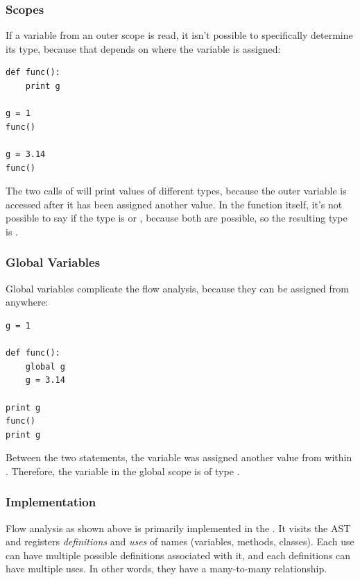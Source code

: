 \documentclass[12pt,halfparskip]{scrreprt}
\begin{document}
\subsubsection{Scopes}

If a variable from an outer scope is read, it isn't possible to specifically determine its type, because that depends on where the variable is assigned:

\begin{lstlisting}
def func():
    print g

g = 1
func()

g = 3.14
func()
\end{lstlisting}

The two calls of  will print values of different types, because the outer variable  is accessed after it has been assigned another value. In the function itself, it's not possible to say if the type is  or , because both are possible, so the resulting type is .

\subsubsection{Global Variables}

Global variables complicate the flow analysis, because they can be assigned from anywhere:

\begin{lstlisting}
g = 1

def func():
    global g
    g = 3.14

print g
func()
print g
\end{lstlisting}

Between the two  statements, the variable  was assigned another value from within . Therefore, the variable  in the global scope is of type .

\subsubsection{Implementation}

Flow analysis as shown above is primarily implemented in the . It visits the AST and registers \emph{definitions} and \emph{uses} of names (variables, methods, classes). Each use can have multiple possible definitions associated with it, and each definitions can have multiple uses. In other words, they have a many-to-many relationship.
\end{document}

